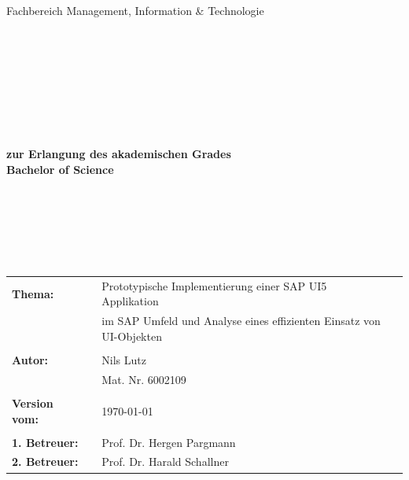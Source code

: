 \begin{center}
\Large{Fachbereich Management, Information \& Technologie}
\end{center}
\begin{verbatim}




\end{verbatim}
\begin{center}
\doublespacing
\textbf{\LARGE{\titleDocument}}\\
\singlespacing
\begin{verbatim}

\end{verbatim}
\end{center}
\begin{verbatim}

\end{verbatim}
\begin{center}

\end{center}
\begin{verbatim}

\end{verbatim}
\begin{center}
\textbf{zur Erlangung des akademischen Grades \\ Bachelor of Science}
\end{center}
\begin{verbatim}






\end{verbatim}
\begin{flushleft}
\begin{tabular}{llll}
\textbf{Thema:} & & Prototypische Implementierung einer SAP UI5 Applikation & \\
& & im SAP Umfeld und Analyse eines effizienten Einsatz von UI-Objekten & \\
& & \\
\textbf{Autor:} & & Nils Lutz& \\
& & Mat. Nr. 6002109 & \\
& & \\
\textbf{Version vom:} & & \today &\\
& & \\
\textbf{1. Betreuer:} & & Prof. Dr. Hergen Pargmann &\\
\textbf{2. Betreuer:} & & Prof. Dr. Harald Schallner &\\
\end{tabular}
\end{flushleft}